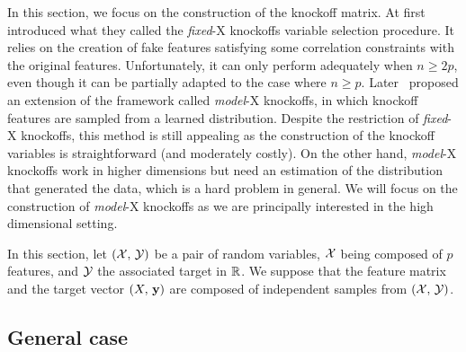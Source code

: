 In this section, we focus on the construction of the knockoff matrix.
At first~\cite{fixed_x_knockoffs} introduced what they called the
\textit{fixed}-X knockoffs variable selection procedure.
It relies on the creation of fake features satisfying some correlation constraints with the original features.
Unfortunately, it can only perform adequately when $n \geq 2p$,
even though it can be partially adapted to the case where $n \geq p$.
Later~\cite{model_x_knockoffs} proposed an extension of the framework called \textit{model}-X knockoffs,
in which knockoff features are sampled from a learned distribution.
Despite the restriction of \textit{fixed}-X knockoffs, this method is still appealing as the construction of the
knockoff variables is straightforward (and moderately costly).
On the other hand, \textit{model}-X knockoffs work in higher dimensions
but need an estimation of the distribution that generated the data,
which is a hard problem in general.
We will focus on the construction of \textit{model}-X knockoffs as we are principally interested in the
high dimensional setting.

In this section, let $(\mathcal{X},\, \mathcal{Y})$ be a pair of random variables,
$\mathcal{X}$ being composed of $p$ features,
and $\mathcal{Y}$ the associated target in $\mathbb{R}$.
We suppose that the feature matrix and the target vector $(X,\, \mathbf{y})$
are composed of independent samples from $(\mathcal{X},\, \mathcal{Y})$.

\subsection{General case}\label{subsec:general_case}

